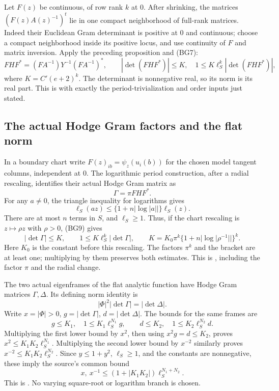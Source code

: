 Let \(F(z)\) be continuous, of row rank \(k\) at \(0\).
After shrinking, the matrices \((F(z)A(z)^{-1})^t\) lie in one
compact neighborhood of full-rank matrices.
Indeed their Euclidean Gram determinant is positive at \(0\)
and continuous; choose a compact neighborhood inside its positive
locus, and use continuity of \(F\) and matrix inversion.
Apply the preceding proposition and (BG7):
\[
 FHF^*=(FA^{-1})Y^{-1}(FA^{-1})^*,\qquad
 |\det(FHF^*)|\le K,\quad
       1\le K\ell_S^k|\det(FHF^*)|,
 \tag{BG9}\label{eq:faithful-log-period-subframe}
\]
where \(K=C'(e+2)^k\).
The determinant is nonnegative real, so its norm is its real part.
This is  with exactly
the period-trivialization and order inputs just stated.

\subsection{The actual Hodge Gram factors and the flat norm}
In a boundary chart write \(F(z)_{ib}=\psi_z(u_i(b))\)
for the chosen model tangent columns, independent at \(0\).
The logarithmic period construction, after a radial rescaling,
identifies their actual Hodge Gram matrix as
\[
                         \Gamma=\pi FHF^* .
 \tag{BG10}\label{eq:faithful-hodge-gram}
\]
For any \(a\ne0\), the triangle inequality for logarithms gives
\[
 \ell_S(az)\le\{1+n|\log|a||\}\ell_S(z).
 \tag{BG11}\label{eq:faithful-log-weight-rescaling}
\]
There are at most \(n\) terms in \(S\), and \(\ell_S\ge1\).
Thus, if the chart rescaling is \(z\mapsto\rho z\) with \(\rho>0\),
(BG9) gives
\[
 |\det\Gamma|\le K,\qquad
             1\le K\ell_S^k|\det\Gamma|,\qquad
 K=K_0\pi^k\{1+n|\log|\rho^{-1}||\}^k .
 \tag{BG12}\label{eq:faithful-hodge-gram-log-bound}
\]
Here \(K_0\) is the constant before this rescaling.
The factors \(\pi^k\) and the bracket are at least one;
multiplying by them preserves both estimates.
This is , including the factor
\(\pi\) and the radial change.

The two actual eigenframes of the flat analytic function have
Hodge Gram matrices \(\Gamma,\Delta\).
Its defining norm identity is
\[
                     |\Phi|^2|\det\Gamma|=|\det\Delta|.
 \tag{BG13}\label{eq:faithful-unitAn-gram-norm}
\]
Write \(x=|\Phi|>0\), \(g=|\det\Gamma|\), \(d=|\det\Delta|\).
The bounds for the same frames are
\[
 g\le K_1,\quad1\le K_1\ell_S^{N_1}g,\qquad
 d\le K_2,\quad1\le K_2\ell_S^{N_2}d.
\]
Multiplying the first lower bound by \(x^2\), then using
\(x^2g=d\le K_2\), proves
\(x^2\le K_1K_2\ell_S^{N_1}\).
Multiplying the second lower bound by \(x^{-2}\) similarly
proves \(x^{-2}\le K_1K_2\ell_S^{N_2}\).
Since \(y\le1+y^2\), \(\ell_S\ge1\), and the constants are
nonnegative, these imply the source's common bound
\[
           x,\ x^{-1}\le(1+|K_1K_2|)\ell_S^{N_1+N_2}.
 \tag{BG14}\label{eq:faithful-flat-two-sided-log}
\]
This is .
No varying square-root or logarithm branch is chosen.

